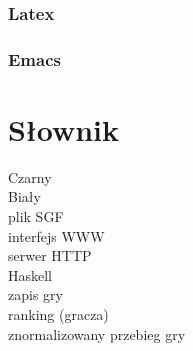 \documentclass[11pt,leqno]{article}
\begin{document}
\subsubsection{Latex}
\subsubsection{Emacs}

\section{Słownik}
Czarny \\
Biały \\
plik SGF \\
interfejs WWW \\
serwer HTTP \\
Haskell \\
zapis gry \\
ranking (gracza) \\
znormalizowany przebieg gry \\

\end{document}
